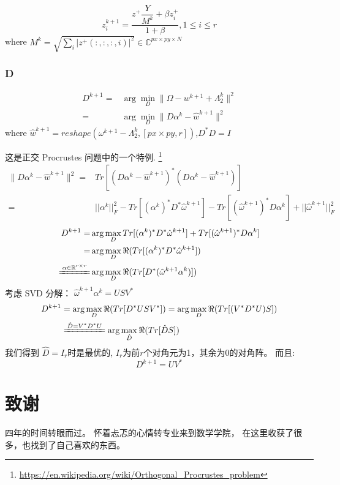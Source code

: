 \documentclass[12pt]{article}
\begin{document}
\begin{equation}
z_i^{k+1} = \dfrac{z^+ \dfrac{Y}{ M^k} + \beta z_i^+}{1+\beta}, 1 \leq i \leq r
\label{zup}
\end{equation}
where $M^k =\sqrt{\sum_i |z^+(:,:,:,i)|^2} \in \mathbb{C}^{px \times py \times N}$

\subsubsection{D}

$$
\begin{aligned}
D^{k+1} =& \arg \min_{D} \| \Omega -  w^{k+1} + \Lambda_2^{k}\|^{2} \\
=& \arg \min_{D} \| D\alpha^k - \hat {w}^{k+1}\|^{2} 
\end{aligned}
$$
where $\hat {w}^{k+1} = reshape( \omega^{k+1} - \Lambda_2^{k},[px\times py,r])$,$D^*D=I$

这是正交 Procrustes 问题中的一个特例. \footnote{\url{https://en.wikipedia.org/wiki/Orthogonal_Procrustes_problem}}
$$
\begin{aligned}
\| D\alpha^k - \hat {w}^{k+1}\|^{2} =& Tr[( D\alpha^k - \hat {w}^{k+1})^*( D\alpha^k - \hat {w}^{k+1})] \\
=& ||\alpha^k||_F^2 - Tr[(\alpha^k)^*D^*\hat{\omega}^{k+1}] - Tr[(\hat{\omega}^{k+1})^*D \alpha^k] + ||\hat{\omega}^{k+1}||_F^2
\end{aligned}
$$
$$
\begin{aligned}
D^{k+1} =& \arg \max_{D} Tr[(\alpha^k)^*D^*\hat{\omega}^{k+1}] + Tr[(\hat{\omega}^{k+1})^*D \alpha^k] \\
=& \arg \max_{D}  \Re{ (Tr[(\alpha^k)^*D^*\hat{\omega}^{k+1}] )}\\
\xlongequal{\alpha \in \mathbb{R}^{r\times r}}& \arg \max_{D}  \Re{ (Tr[D^* ( \hat{\omega}^{k+1}\alpha^k)]  )}
\end{aligned}
$$
考虑 SVD 分解： $\hat{\omega}^{k+1}\alpha^k = USV^*$
$$
\begin{aligned}
D^{k+1} &= \arg \max_{D} \Re{ (Tr[D^*USV^*]  )}
= \arg \max_{D} \Re{ (Tr[(V^*D^*U)S]  )}\\
&\xlongequal{\hat{D} = V^*D^*U}  \arg \max_{\hat{D}} \Re{ (Tr[\hat{D}S]  )}
\end{aligned}
$$
我们得到 $\hat{D} = I_r$时是最优的, $I_r$为前$r$个对角元为1，其余为0的对角阵。 而且:
\begin{equation}
D^{k+1} = UV^*
\label{Dup}
\end{equation}

\section{致谢}
四年的时间转眼而过。 怀着忐忑的心情转专业来到数学学院， 在这里收获了很多，也找到了自己喜欢的东西。
\end{document}
